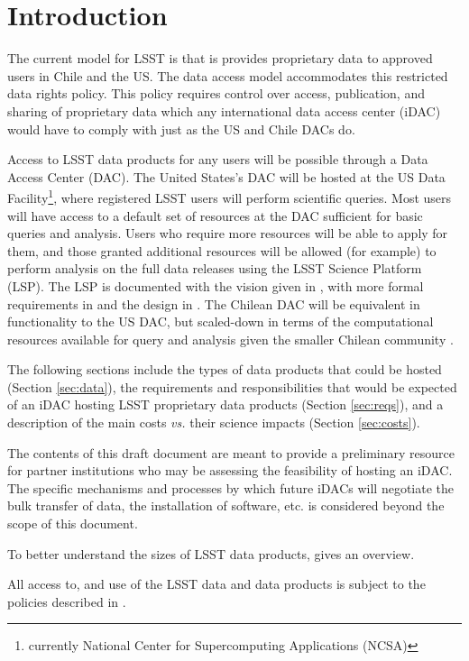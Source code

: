 \section{Introduction}\label{sec:intro}


The current model for LSST is that is provides proprietary data to approved users in Chile and the US. The data access model accommodates this restricted data rights policy. This policy requires control over access, publication, and sharing of proprietary data which any international data access center (iDAC) would have to comply with just as the US and Chile DACs do.

Access to LSST data products for any users will be possible through a Data Access Center (DAC). The United States's DAC will be hosted at the US Data Facility\footnote{currently National Center for Supercomputing Applications (NCSA)},
where registered LSST users will perform scientific queries. Most users will have access to a default set of resources at the DAC sufficient for basic queries and analysis. Users who require more resources will be able to apply for them, and those granted additional resources will be allowed (for example) to perform analysis on the full data releases using the LSST Science Platform (LSP). The LSP is documented with the vision given in , with more formal requirements in  and the design in . The Chilean DAC will be equivalent in functionality to the US DAC, but scaled-down in terms of the computational resources available for query and analysis given the smaller Chilean community .

The following sections include the types of data products that could be hosted (Section \ref{sec:data}), the requirements and responsibilities that would be expected of an iDAC hosting LSST proprietary data products (Section \ref{sec:reqs}), and a description of the main costs {\it vs.} their science impacts (Section \ref{sec:costs}).

The contents of this draft document are meant to provide a preliminary resource for partner institutions who may be assessing the feasibility of hosting an iDAC. The specific mechanisms and processes by which future iDACs will negotiate the bulk transfer of data, the installation of software, etc. is considered beyond the scope of this document.

To better understand the sizes of LSST data products,  gives an overview.



All access to, and use of the LSST data and data products is subject to the policies described in .
